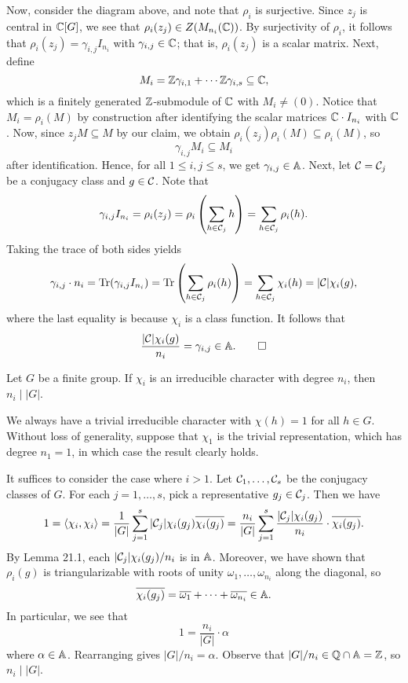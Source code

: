 \begin{pf}
    Now, consider the diagram above, and note that $\rho_i$ is surjective. Since 
    $z_j$ is central in $\mathbb{C}[G]$, we see that $\rho_i(z_j) \in Z(M_{n_i}(\mathbb{C}))$. 
    By surjectivity of $\rho_i$, it follows that $\rho_i(z_j) = 
    \gamma_{i,j} I_{n_i}$ with $\gamma_{i,j} \in \mathbb{C}$; that is, $\rho_i(z_j)$ is a 
    scalar matrix. Next, define 
    \[ M_i = \mathbb{Z}\gamma_{i,1} + \cdots \mathbb{Z}\gamma_{i,s} \subseteq \mathbb{C}, \] 
    which is a finitely generated $\mathbb{Z}$-submodule of $\mathbb{C}$ with $M_i \neq (0)$. 
    Notice that $M_i = \rho_i(M)$ by construction after identifying the 
    scalar matrices $\mathbb{C} \cdot I_{n_i}$ with $\mathbb{C}$. Now, since $z_j M \subseteq M$ 
    by our claim, we obtain $\rho_i(z_j) \rho_i(M) \subseteq \rho_i(M)$, so 
    \[ \gamma_{i,j} M_i \subseteq M_i \] 
    after identification. Hence, for all $1 \leq i, j \leq s$, we get 
    $\gamma_{i,j} \in \mathbb{A}$. Next, let ${\cal C} = {\cal C}_j$ be a conjugacy class 
    and $g \in {\cal C}$. Note that 
    \[ \gamma_{i,j} I_{n_i} = \rho_i(z_j) = \rho_i \left( \sum_{h \in {\cal C}_j} h 
    \right) = \sum_{h \in {\cal C}_j} \rho_i(h). \] 
    Taking the trace of both sides yields 
    \[ \gamma_{i,j} \cdot n_i = \operatorname{Tr}(\gamma_{i,j} I_{n_i}) = 
    \operatorname{Tr}\left( \sum_{h\in {\cal C}_j} \rho_i(h) \right) = \sum_{h \in {\cal C}_j} 
    \chi_i(h) = |{\cal C}| \chi_i(g), \] 
    where the last equality is because $\chi_i$ is a class function. It follows that 
    \[ \frac{|{\cal C}| \chi_i(g)}{n_i} = \gamma_{i,j} \in \mathbb{A}. \qedhere \] 
\end{pf}

\begin{theo}{}
    Let $G$ be a finite group. If $\chi_i$ is an irreducible character with 
    degree $n_i$, then $n_i \mid |G|$. 
\end{theo}
\begin{pf}
    We always have a trivial irreducible character with $\chi(h) = 1$ for all 
    $h \in G$. Without loss of generality, suppose that $\chi_1$ is the trivial 
    representation, which has degree $n_1 = 1$, in which case the result 
    clearly holds. 

    It suffices to consider the case where $i > 1$. Let ${\cal C}_1, \dots, 
    {\cal C}_s$ be the conjugacy classes of $G$. For each $j = 1, \dots, 
    s$, pick a representative $g_j \in {\cal C}_j$. Then we have 
    \[ 1 = \langle \chi_i, \chi_i \rangle = 
    \frac1{|G|} \sum_{j=1}^s |{\cal C}_j| \chi_i(g_j) \overline{\chi_i(g_j)} = 
    \frac{n_i}{|G|} \sum_{j=1}^s \frac{|{\cal C}_j| \chi_i(g_j)}{n_i} 
    \cdot \overline{\chi_i(g_j)}. \] 
    By Lemma 21.1, each $|{\cal C}_j|\chi_i(g_j)/n_i$ is in $\mathbb{A}$. Moreover, 
    we have shown that $\rho_i(g)$ is triangularizable with roots of 
    unity $\omega_1, \dots, \omega_{n_i}$ along the diagonal, so 
    \[ \overline{\chi_i(g_j)} = \overline{\omega_1} + \cdots + \overline{\omega_{n_i}} 
    \in \mathbb{A}. \] 
    In particular, we see that 
    \[ 1 = \frac{n_i}{|G|} \cdot \alpha \] 
    where $\alpha \in \mathbb{A}$. Rearranging gives $|G|/n_i = \alpha$. Observe that 
    $|G|/n_i \in \mathbb{Q} \cap \mathbb{A} = \mathbb{Z}$, so $n_i \mid |G|$. 
\end{pf}